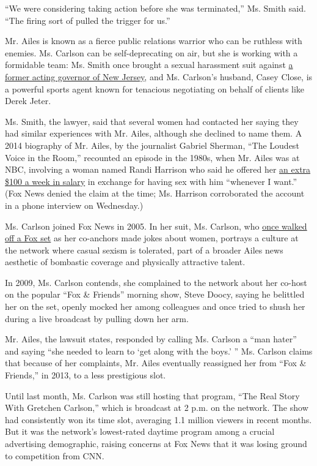 ``We were considering taking action before she was terminated,'' Ms.
Smith said. ``The firing sort of pulled the trigger for us.''

Mr. Ailes is known as a fierce public relations warrior who can be
ruthless with enemies. Ms. Carlson can be self-deprecating on air, but
she is working with a formidable team: Ms. Smith once brought a sexual
harassment suit against
\href{http://www.nytimes3xbfgragh.onion/2007/10/25/nyregion/25donald.html}{a
former acting governor of New Jersey}, and Ms. Carlson's husband, Casey
Close, is a powerful sports agent known for tenacious negotiating on
behalf of clients like Derek Jeter.

Ms. Smith, the lawyer, said that several women had contacted her saying
they had similar experiences with Mr. Ailes, although she declined to
name them. A 2014 biography of Mr. Ailes, by the journalist Gabriel
Sherman, ``The Loudest Voice in the Room,'' recounted an episode in the
1980s, when Mr. Ailes was at NBC, involving a woman named Randi Harrison
who said he offered her
\href{http://www.nytimes3xbfgragh.onion/2014/01/08/business/media/biography-casts-critical-light-on-fox-news-chief.html}{an
extra \$100 a week in salary} in exchange for having sex with him
``whenever I want.'' (Fox News denied the claim at the time; Ms.
Harrison corroborated the account in a phone interview on Wednesday.)

Ms. Carlson joined Fox News in 2005. In her suit, Ms. Carlson, who
\href{http://www.businessinsider.com/gretchen-carlson-walk-off-fox-and-friends-2012-6}{once
walked off a Fox set} as her co-anchors made jokes about women, portrays
a culture at the network where casual sexism is tolerated, part of a
broader Ailes news aesthetic of bombastic coverage and physically
attractive talent.

In 2009, Ms. Carlson contends, she complained to the network about her
co-host on the popular ``Fox \& Friends'' morning show, Steve Doocy,
saying he belittled her on the set, openly mocked her among colleagues
and once tried to shush her during a live broadcast by pulling down her
arm.

Mr. Ailes, the lawsuit states, responded by calling Ms. Carlson a ``man
hater'' and saying ``she needed to learn to `get along with the boys.'
'' Ms. Carlson claims that because of her complaints, Mr. Ailes
eventually reassigned her from ``Fox \& Friends,'' in 2013, to a less
prestigious slot.

Until last month, Ms. Carlson was still hosting that program, ``The Real
Story With Gretchen Carlson,'' which is broadcast at 2 p.m. on the
network. The show had consistently won its time slot, averaging 1.1
million viewers in recent months. But it was the network's lowest-rated
daytime program among a crucial advertising demographic, raising
concerns at Fox News that it was losing ground to competition from CNN.

